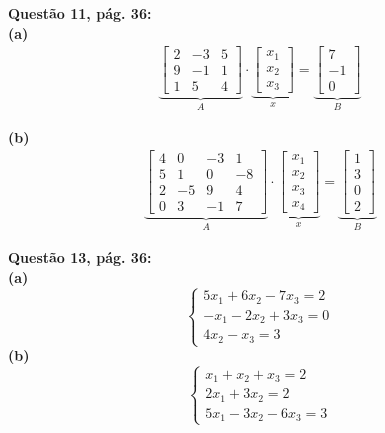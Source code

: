 \documentclass[a4paper,12pt]{article}
\begin{document}
\textbf{Questão 11, pág. 36:}\\
\textbf{(a)}
\begin{align*}
    \underbrace{
    \begin{bmatrix}
        2 & -3 & 5\\
        9 & -1 & 1\\
        1 & 5 & 4
    \end{bmatrix}}_{A} 
    \cdot
    \underbrace{
    \begin{bmatrix}
        x_{1} \\
        x_{2} \\
        x_{3}
    \end{bmatrix}}_{x}
    =
    \underbrace{
    \begin{bmatrix}
        7 \\
        -1 \\
        0
    \end{bmatrix}}_{B}
\end{align*}

\textbf{(b)}
\begin{align*}
    \underbrace{
    \begin{bmatrix}
        4 & 0 & -3 & 1\\
        5 & 1 & 0 & -8\\
        2 & -5 & 9 & 4\\
        0 & 3 & -1 & 7
    \end{bmatrix}}_{A} 
    \cdot
    \underbrace{
    \begin{bmatrix}
        x_{1} \\
        x_{2} \\
        x_{3} \\
        x_{4}
    \end{bmatrix}}_{x}
    =
    \underbrace{
    \begin{bmatrix}
        1 \\
        3 \\
        0 \\
        2
    \end{bmatrix}}_{B}
\end{align*}

\textbf{Questão 13, pág. 36:}\\
\textbf{(a)}
\begin{equation*}
    \begin{cases*}
        5x_1 + 6x_2 - 7x_3 = 2 \\
        -x_1 - 2x_2 + 3x_3 = 0 \\
               4x_2 - x_ 3 = 3
    \end{cases*}
\end{equation*}
\textbf{(b)}
\begin{equation*}
    \begin{cases*}
         x_1 +  x_2 +  x_3 = 2 \\
        2x_1 + 3x_2        = 2 \\
        5x_1 - 3x_2 - 6x_3 = 3
    \end{cases*}
\end{equation*}
\end{document}
